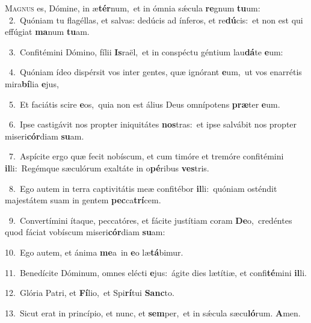 \lettrine{\initial\textcolor{\initialcolor}{M}}{agnus} es, Dómine, in æ\-\textbf{tér}\-num,~\star et in ómnia sǽcula \textbf{re}\-gnum \textbf{tu}\-um:\\
{\numbfont\textcolor{\numbcolor}{~2.}}~Quóniam tu flagéllas, et salvas: dedúcis ad ínferos, et re\-\textbf{dú}\-cis:~\star et non est qui effúgiat \textbf{ma}\-num \textbf{tu}\-am.\par
{\numbfont\textcolor{\numbcolor}{~3.}}~Confitémini Dómino, fílii \textbf{Is}\-raël,~\star et in conspéctu géntium lau\-\textbf{dá}\-te \textbf{e}\-um:\par
{\numbfont\textcolor{\numbcolor}{~4.}}~Quóniam ídeo dispérsit vos inter gentes, quæ ignórant \textbf{e}\-um,~\star ut vos enarrétis mira\-\textbf{bí}\-lia \textbf{e}\-jus,\par
{\numbfont\textcolor{\numbcolor}{~5.}}~Et faciátis scire \textbf{e}\-os,~\star quia non est álius Deus omnípotens \textbf{præ}\-ter \textbf{e}\-um.\par
{\numbfont\textcolor{\numbcolor}{~6.}}~Ipse castigávit nos propter iniquitátes \textbf{nos}\-tras:~\star et ipse salvábit nos propter miseri\-\textbf{cór}\-diam \textbf{su}\-am.\par
{\numbfont\textcolor{\numbcolor}{~7.}}~Aspícite ergo quæ fecit nobíscum, et cum timóre et tremóre confitémini \textbf{il}\-li:~\star Regémque sæculórum exaltáte in o\-\textbf{pé}\-ribus \textbf{ves}\-tris.\par
{\numbfont\textcolor{\numbcolor}{~8.}}~Ego autem in terra captivitátis meæ confitébor \textbf{il}\-li:~\star quóniam osténdit majestátem suam in gentem \textbf{pec}\-ca\-\textbf{trí}\-cem.\par
{\numbfont\textcolor{\numbcolor}{~9.}}~Convertímini ítaque, peccatóres, et fácite justítiam coram \textbf{De}\-o,~\star credéntes quod fáciat vobíscum miseri\-\textbf{cór}\-diam \textbf{su}\-am:\par
{\numbfont\textcolor{\numbcolor}{10.}}~Ego autem, et ánima \textbf{me}\-a~\star in \textbf{e}\-o læ\-\textbf{tá}\-bimur.\par
{\numbfont\textcolor{\numbcolor}{11.}}~Benedícite Dóminum, omnes elécti \textbf{e}\-jus:~\star ágite dies lætítiæ, et confi\-\textbf{té}\-mini \textbf{il}\-li.\par
{\numbfont\textcolor{\numbcolor}{12.}}~Glória Patri, et \textbf{Fí}\-lio,~\star et Spi\-\textbf{rí}\-tui \textbf{Sanc}\-to.\par
{\numbfont\textcolor{\numbcolor}{13.}}~Sicut erat in princípio, et nunc, et \textbf{sem}\-per,~\star et in sǽcula sæcu\-\textbf{ló}\-rum. \textbf{A}\-men.\par
